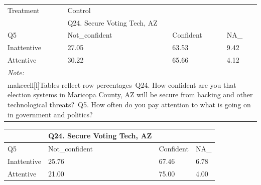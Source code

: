 \documentclass[
  11pt,
  a4paper,
]{article}
\begin{document}
\begin{table}
\centering
\centering
\begin{tabular}[t]{l|l|l|l}
\hline
\multicolumn{1}{l|}{Treatment} & \multicolumn{1}{l}{Control} \\
\cline{1-1} \cline{2-2}
 & Q24. Secure Voting Tech, AZ &  & \\
\hline
Q5 & Not\_confident & Confident & NA\_\\
\hline
Inattentive & 27.05 & 63.53 & 9.42\\
\hline
Attentive & 30.22 & 65.66 & 4.12\\
\hline
\multicolumn{4}{l}{\rule{0pt}{1em}\textit{Note: }}\\
\multicolumn{4}{l}{\rule{0pt}{1em}makecell[l]{Tables reflect row percentages\ Q24. How confident are you that election systems in Maricopa County, AZ will be secure from hacking and other technological threats?\ Q5. How often do you pay attention to what is going on in government and politics?}}\\
\end{tabular}
\centering
\begin{tabular}[t]{l|l|l|l}
\hline
 & Q24. Secure Voting Tech, AZ &  & \\
\hline
Q5 & Not\_confident & Confident & NA\_\\
\hline
Inattentive & 25.76 & 67.46 & 6.78\\
\hline
Attentive & 21.00 & 75.00 & 4.00\\
\hline
\end{tabular}
\end{table}
\end{document}
